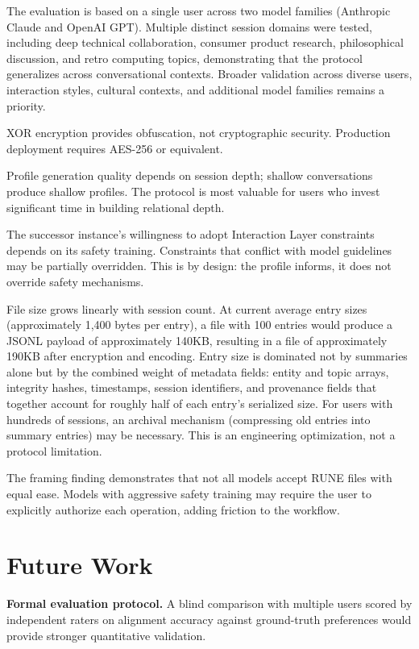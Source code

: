 \documentclass[11pt,a4paper]{article}
\begin{document}
The evaluation is based on a single user across two model families (Anthropic Claude and OpenAI GPT). Multiple distinct session domains were tested, including deep technical collaboration, consumer product research, philosophical discussion, and retro computing topics, demonstrating that the protocol generalizes across conversational contexts. Broader validation across diverse users, interaction styles, cultural contexts, and additional model families remains a priority.

XOR encryption provides obfuscation, not cryptographic security. Production deployment requires AES-256 or equivalent.

Profile generation quality depends on session depth; shallow conversations produce shallow profiles. The protocol is most valuable for users who invest significant time in building relational depth.

The successor instance's willingness to adopt Interaction Layer constraints depends on its safety training. Constraints that conflict with model guidelines may be partially overridden. This is by design: the profile informs, it does not override safety mechanisms.

File size grows linearly with session count. At current average entry sizes (approximately 1,400 bytes per entry), a file with 100 entries would produce a JSONL payload of approximately 140KB, resulting in a file of approximately 190KB after encryption and encoding. Entry size is dominated not by summaries alone but by the combined weight of metadata fields: entity and topic arrays, integrity hashes, timestamps, session identifiers, and provenance fields that together account for roughly half of each entry's serialized size. For users with hundreds of sessions, an archival mechanism (compressing old entries into summary entries) may be necessary. This is an engineering optimization, not a protocol limitation.

The framing finding demonstrates that not all models accept RUNE files with equal ease. Models with aggressive safety training may require the user to explicitly authorize each operation, adding friction to the workflow.

\section{Future Work}

\textbf{Formal evaluation protocol.} A blind comparison with multiple users scored by independent raters on alignment accuracy against ground-truth preferences would provide stronger quantitative validation.
\end{document}
